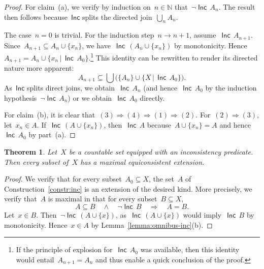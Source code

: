 \documentclass[com,11pt,crcready]{iosart2x}
\theoremstyle{definition}
\theoremstyle{plain}
\newtheorem{theorem}[definition]{Theorem}
\theoremstyle{remark}
\newcommand{\Incbare}{\mathsf{Inc}}
\newcommand{\Inc}[1]{\operatorname{\Incbare}\,#1}
\newcommand{\?}{\,{:}\,}
\newcommand{\NN}{\mathbb{N}}
\renewcommand{\_}{\mathpunct{.}\,}
\begin{document}
\begin{proof}For claim~(a), we verify by induction on~$n \in \NN$ that~$\neg
\Inc{A_n}$. The result then follows because~$\Incbare$ splits the directed join~$\bigcup_n A_n$.

The case~$n = 0$ is trivial. For the induction step~$n \to n+1$,
assume~$\Inc{A_{n+1}}$. Since~$A_{n+1} \subseteq A_n \cup \{x_n\}$, we
have~$\Inc{(A_n \cup \{ x_n \})}$ by monotonicity. Hence~$A_{n+1} = A_n \cup \{ x_n \,|\, \Inc{A_0}
\}$.\footnote{If the principle of explosion for~$\Inc{A_0}$ was available, then
this identity would entail~$A_{n+1} = A_n$ and thus enable a quick conclusion
of the proof.} This identity can be rewritten to render its directed nature
more apparent:
\[ A_{n+1} \subseteq \bigcup \bigl(\{A_n\} \cup \{X \,|\, \Inc{A_0}\}\bigr). \]
As~$\Incbare$ splits direct joins, we obtain~$\Inc{A_n}$ (and hence~$\Inc{A_0}$ by the
induction hypothesis~$\neg \Inc{A_n}$) or we obtain~$\Inc{A_0}$ directly.

For claim~(b), it is clear that~$(3) \Rightarrow (4) \Rightarrow (1) \Rightarrow
(2)$. For~$(2) \Rightarrow (3)$, let~$x_n \in A$.
If~$\Inc{(A\cup\{x_n\})}$, then~$\Inc{A}$ because~$A\cup\{x_n\}=A$ and hence~$\Inc{A_0}$
by part~(a).
\end{proof}

\begin{theorem}\label{thm:max-inc-countable}Let~$X$ be a countable set equipped
with an inconsistency predicate. Then every subset of~$X$ has a maximal
equiconsistent extension.\end{theorem}

\begin{proof}We verify that for every subset~$A_0 \subseteq X$, the set~$A$ of
Construction~\ref{constr:inc} is an extension of the desired kind. More
precisely, we verify that~$A$ is maximal in that for every subset~$B \subseteq X$,
\[ A \subseteq B \quad\wedge\quad \neg \Inc{B} \quad\Longrightarrow\quad A = B. \]
Let~$x \in B$. Then~$\neg \Inc{(A \cup \{ x \})}$, as~$\Inc{(A \cup \{x\})}$
would imply~$\Inc{B}$ by monotonicity. Hence~$x \in A$ by
Lemma~\ref{lemma:omnibus-inc}(b).
\end{proof}
\end{document}
